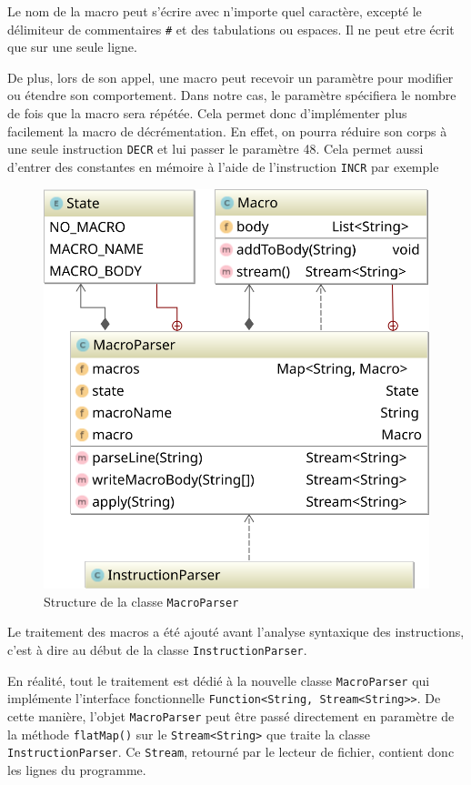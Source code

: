 \documentclass{article}
\begin{document}
        Le nom de la macro peut s'écrire avec n'importe quel caractère, excepté le délimiteur de commentaires \texttt{\#} et des tabulations ou espaces. Il ne peut etre écrit que sur une seule ligne.
        
        De plus, lors de son appel, une macro peut recevoir un paramètre pour modifier ou étendre son comportement.
Dans notre cas, le paramètre spécifiera le nombre de fois que la macro sera répétée. Cela permet donc d'implémenter plus facilement la macro de décrémentation. En effet, on pourra réduire son corps à une seule instruction \texttt{DECR} et lui passer le paramètre 48.
Cela permet aussi d'entrer des constantes en mémoire à l'aide de l'instruction \texttt{INCR} par exemple


\begin{figure}[h]
        \centering
        \includegraphics[scale=0.6]{svgL3/macro}
        \caption{Structure de la classe \texttt{MacroParser}}
\end{figure}

        Le traitement des macros a été ajouté avant l'analyse syntaxique des instructions, c'est à dire au début de la classe \texttt{InstructionParser}.

      En réalité, tout le traitement est dédié à la nouvelle classe \texttt{MacroParser} qui implémente l'interface fonctionnelle \texttt{Function<String, Stream<String>>}. De cette manière, l'objet \texttt{MacroParser} peut être passé directement en paramètre de la méthode \texttt{flatMap()} sur le \texttt{Stream<String>} que traite la classe \texttt{InstructionParser}. Ce \texttt{Stream}, retourné par le lecteur de fichier, contient donc les lignes du programme.
\end{document}
